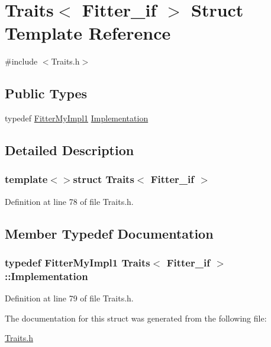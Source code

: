 \hypertarget{struct_traits_3_01_fitter__if_01_4}{\section{Traits$<$ Fitter\-\_\-if $>$ Struct Template Reference}
\label{struct_traits_3_01_fitter__if_01_4}
}


{\ttfamily \#include $<$Traits.\-h$>$}

\subsection*{Public Types}
\begin{DoxyCompactItemize}
\item 
typedef \hyperlink{class_fitter_my_impl1}{Fitter\-My\-Impl1} \hyperlink{struct_traits_3_01_fitter__if_01_4_ae583860c62ded7016b4d038d17b9b480}{Implementation}
\end{DoxyCompactItemize}


\subsection{Detailed Description}
\subsubsection*{template$<$$>$struct Traits$<$ Fitter\-\_\-if $>$}



Definition at line 78 of file Traits.\-h.



\subsection{Member Typedef Documentation}
\hypertarget{struct_traits_3_01_fitter__if_01_4_ae583860c62ded7016b4d038d17b9b480}{
\subsubsection[{Implementation}]{\setlength{\rightskip}{0pt plus 5cm}typedef {\bf Fitter\-My\-Impl1} {\bf Traits}$<$ {\bf Fitter\-\_\-if} $>$\-::{\bf Implementation}}}\label{struct_traits_3_01_fitter__if_01_4_ae583860c62ded7016b4d038d17b9b480}


Definition at line 79 of file Traits.\-h.



The documentation for this struct was generated from the following file\-:\begin{DoxyCompactItemize}
\item 
\hyperlink{_traits_8h}{Traits.\-h}\end{DoxyCompactItemize}
